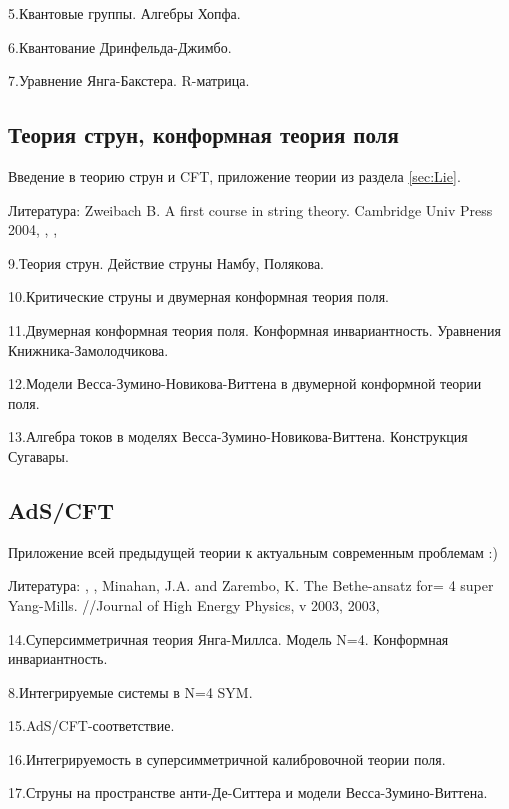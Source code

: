 \documentclass[a4paper,12pt]{article}
\theoremstyle{definition} \newtheorem{Def}{Definition}
\begin{document}
5.Квантовые группы. Алгебры Хопфа. 

6.Квантование Дринфельда-Джимбо.

7.Уравнение Янга-Бакстера. R-матрица.

\subsection{Теория струн, конформная теория поля}
\label{sec:CFT}

Введение в теорию струн и CFT, приложение теории из раздела \ref{sec:Lie}.

Литература:
Zweibach B. A first course in string theory. Cambridge Univ Press 2004, \cite{difrancesco1997cft}, \cite{Walton:1999xc}, \cite{gaberdiel2000icf}

9.Теория струн. Действие струны Намбу, Полякова.

10.Критические струны и двумерная конформная теория поля.

11.Двумерная конформная теория поля. Конформная инвариантность. Уравнения Книжника-Замолодчикова.

12.Модели Весса-Зумино-Новикова-Виттена в двумерной конформной теории поля.

13.Алгебра токов в моделях Весса-Зумино-Новикова-Виттена. Конструкция Сугавары.


\subsection{AdS/CFT}
\label{sec:adscft}

Приложение всей предыдущей теории к актуальным современным проблемам :)

Литература:
\cite{Aharony:1999ti}, \cite{D'Hoker:2002aw}, Minahan, J.A. and Zarembo, K. The Bethe-ansatz for= 4 super Yang-Mills. //Journal of High Energy Physics, v 2003, 2003, \cite{Maldacena:2000hw,Maldacena:2000kv,Maldacena:2001km,Maldacena:2001ky}

14.Суперсимметричная теория Янга-Миллса. Модель N=4. Конформная инвариантность.

8.Интегрируемые системы в N=4 SYM.

15.AdS/CFT-соответствие.

16.Интегрируемость в суперсимметричной калибровочной теории поля.

17.Струны на пространстве анти-Де-Ситтера и модели Весса-Зумино-Виттена.

{}

\end{document}
